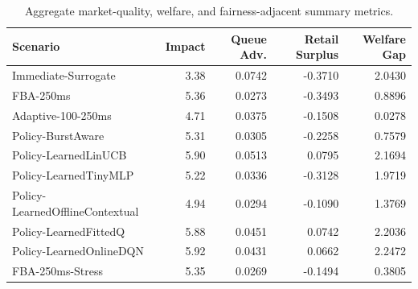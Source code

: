 \documentclass[11pt]{article}
\begin{document}
\begin{table}[t]
\centering
\begin{tabular}{lrrrr}
\toprule
Scenario & Impact & Queue Adv. & Retail Surplus & Welfare Gap \\
\midrule
Immediate-Surrogate & 3.38 & 0.0742 & -0.3710 & 2.0430 \\
FBA-250ms & 5.36 & 0.0273 & -0.3493 & 0.8896 \\
Adaptive-100-250ms & 4.71 & 0.0375 & -0.1508 & 0.0278 \\
Policy-BurstAware & 5.31 & 0.0305 & -0.2258 & 0.7579 \\
Policy-LearnedLinUCB & 5.90 & 0.0513 & 0.0795 & 2.1694 \\
Policy-LearnedTinyMLP & 5.22 & 0.0336 & -0.3128 & 1.9719 \\
Policy-LearnedOfflineContextual & 4.94 & 0.0294 & -0.1090 & 1.3769 \\
Policy-LearnedFittedQ & 5.88 & 0.0451 & 0.0742 & 2.2036 \\
Policy-LearnedOnlineDQN & 5.92 & 0.0431 & 0.0662 & 2.2472 \\
FBA-250ms-Stress & 5.35 & 0.0269 & -0.1494 & 0.3805 \\
\bottomrule
\end{tabular}
\caption{Aggregate market-quality, welfare, and fairness-adjacent summary metrics.}
\end{table}
\end{document}
